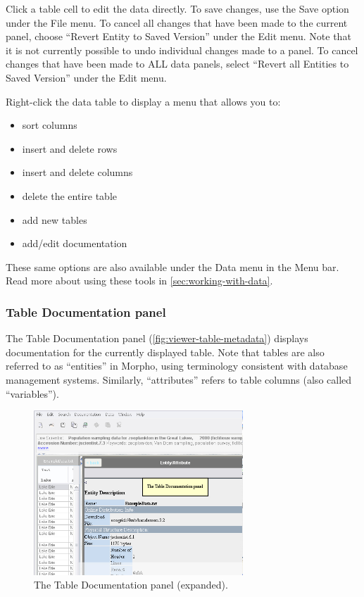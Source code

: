 Click a table cell to edit the data directly. To save changes, use the
Save option under the File menu. To cancel all changes that have been
made to the current panel, choose ``Revert Entity to Saved Version'' under
the Edit menu. Note that it is not currently possible to undo individual
changes made to a panel. To cancel changes that have been made to ALL
data panels, select ``Revert all Entities to Saved Version'' under the
Edit menu.

Right-click the data table to display a menu that allows you to:
\begin{itemize}
  \setlength{\parskip}{1pt}
  \item sort columns 
  \item insert and delete rows 
  \item insert and delete columns 
  \item delete the entire table
  \item add new tables 
  \item add/edit documentation 
\end{itemize}

These same options are also available under the Data menu in the Menu
bar. Read more about using these tools in \autoref{sec:working-with-data}.

\subsubsection{Table Documentation panel} \label{sec:panel-table-doc}

The Table Documentation panel (\autoref{fig:viewer-table-metadata}) displays
documentation for the currently displayed table. Note that tables are
also referred to as ``entities'' in Morpho, using terminology consistent
with database management systems. Similarly, ``attributes'' refers to
table columns (also called ``variables'').

\begin{figure}
  \centering
    \includegraphics[width=0.7\textwidth]{images/viewer-table-metadata.jpg}
  \caption{The Table Documentation panel (expanded).}
  \label{fig:viewer-table-metadata}
\end{figure}

